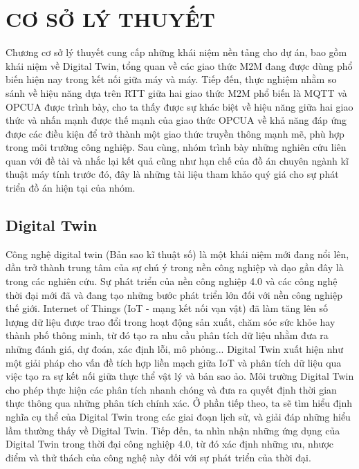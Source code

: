\chapter{CƠ SỞ LÝ THUYẾT}

Chương cơ sở lý thuyết cung cấp những khái niệm nền tảng cho dự án, bao gồm khái niệm về Digital Twin, tổng quan về các giao thức M2M đang được dùng phổ biến hiện nay trong kết nối giữa máy và máy. Tiếp đến, thực nghiệm nhằm so sánh về hiệu năng dựa trên RTT giữa hai giao thức M2M phổ biến là MQTT và OPCUA được trình bày, cho ta thấy được sự khác biệt về hiệu năng giữa hai giao thức và nhấn mạnh được thế mạnh của giao thức OPCUA về khả năng đáp ứng được các điều kiện để trở thành một giao thức truyền thông mạnh mẽ, phù hợp trong môi trường công nghiệp. Sau cùng, nhóm trình bày những nghiên cứu liên quan với đề tài và nhắc lại kết quả cũng như hạn chế của đồ án chuyên ngành kĩ thuật máy tính trước đó, đây là những tài liệu tham khảo quý giá cho sự phát triển đồ án hiện tại của nhóm.

\section{Digital Twin}



Công nghệ digital twin (Bản sao kĩ thuật số) là một khái niệm mới đang nổi lên, dần trở thành trung tâm của sự chú ý trong nền công nghiệp và dạo gần đây là trong các nghiên cứu. Sự phát triển của nền công nghiệp 4.0 và các công nghệ thời đại mới đã và đang tạo những bước phát triển lớn đối với nền công nghiệp thế giới. Internet of Things (IoT - mạng kết nối vạn vật) đã làm tăng lên số lượng dữ liệu được trao đổi trong hoạt động sản xuất, chăm sóc sức khỏe hay thành phố thông minh, từ đó tạo ra nhu cầu phân tích dữ liệu nhằm đưa ra những đánh giá, dự đoán, xác định lỗi, mô phỏng... Digital Twin xuất hiện như một giải pháp cho vấn đề tích hợp liền mạch giữa IoT và phân tích dữ liệu qua việc tạo ra sự kết nối giữa thực thể vật lý và bản sao ảo. Môi trường Digital Twin cho phép thực hiện các phân tích nhanh chóng và đưa ra quyết định thời gian thực thông qua những phân tích chính xác. Ở phần tiếp theo, ta sẽ tìm hiểu định nghĩa cụ thể của Digital Twin trong các giai đoạn lịch sử, và giải đáp những hiểu lầm thường thấy về Digital Twin. Tiếp đến, ta nhìn nhận những ứng dụng của Digital Twin trong thời đại công nghiệp 4.0, từ đó xác định những ưu, nhược điểm và thử thách của công nghệ này đối với sự phát triển của thời đại.


